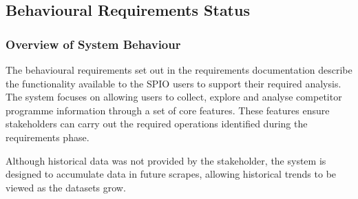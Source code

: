 \subsection{Behavioural Requirements Status}

\subsubsection{Overview of System Behaviour}

The behavioural requirements set out in the requirements documentation describe the functionality available to the SPIO users to support their required analysis. The system focuses on allowing users to collect, explore and analyse competitor programme information through a set of core features. These features ensure stakeholders can carry out the required operations identified during the requirements phase. 

Although historical data was not provided by the stakeholder, the system is designed to accumulate data in future scrapes, allowing historical trends to be viewed as the datasets grow. 

